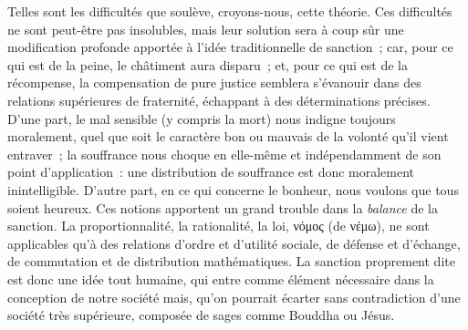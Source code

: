 \documentclass[french,twoside]{book} %
\begin{document}
Telles sont les difficultés que soulève, croyons-nous, cette théorie. Ces difficultés ne sont peut-être pas insolubles, mais leur solution sera à coup sûr une modification profonde apportée à l’idée traditionnelle de sanction ; car, pour ce qui est de la peine, le châtiment aura disparu ; et, pour ce qui est de la récompense, la compensation de pure justice semblera s’évanouir dans des relations supérieures de fraternité, échappant à des déterminations précises. D’une part, le mal sensible (y compris la mort) nous indigne toujours moralement, quel que soit le caractère bon ou mauvais de la volonté qu’il vient entraver ; la souffrance nous choque en elle-même et indépendamment de son point d’application : une distribution de souffrance est donc moralement inintelligible. D’autre part, en ce qui concerne le bonheur, nous voulons que tous soient heureux. Ces notions apportent un grand trouble dans la \emph{balance} de la sanction. La proportionnalité, la rationalité, la loi, νόμος (de νέμω), ne sont applicables qu’à des relations d’ordre et d’utilité sociale, de défense et d’échange, de commutation et de distribution mathématiques. La sanction proprement dite est donc une idée tout humaine, qui entre comme élément nécessaire dans la conception de notre société mais, qu’on pourrait écarter sans contradiction d’une société très supérieure, composée de sages comme Bouddha ou Jésus.\par
\end{document}
